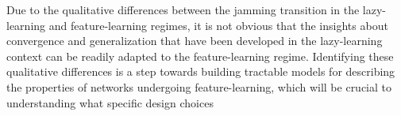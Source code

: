 \documentclass[11pt]{article}
\begin{document}
Due to the qualitative differences between the jamming transition in the lazy-learning and feature-learning regimes, it is not obvious that the insights about convergence and generalization that have been developed in the lazy-learning context can be readily adapted to the feature-learning regime. Identifying these qualitative differences is a step towards building tractable models for describing the properties of networks undergoing feature-learning, which will be crucial to understanding what specific design choices
 
\printbibliography
\end{document}
